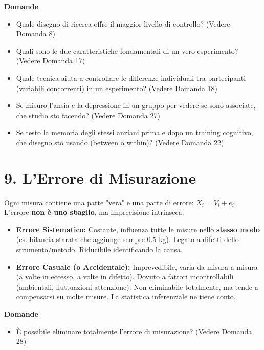 \documentclass[12pt, a4paper]{article}
\newenvironment{reflectionbox}{%
    \medskip %
    \begin{framed}\par\noindent
    \textbf{\color{boxtitlecolor}Domande} \par
    \begin{itemize}[leftmargin=*, label=$\blacktriangleright$]
}{%
    \end{itemize}\par
    \end{framed}
    \medskip %
}
\begin{document}
\begin{reflectionbox}
    \item Quale disegno di ricerca offre il maggior livello di controllo? (Vedere Domanda 8)
    \item Quali sono le due caratteristiche fondamentali di un vero esperimento? (Vedere Domanda 17)
    \item Quale tecnica aiuta a controllare le differenze individuali tra partecipanti (variabili concorrenti) in un esperimento? (Vedere Domanda 18)
    \item Se misuro l'ansia e la depressione in un gruppo per vedere se sono associate, che studio sto facendo? (Vedere Domanda 27)
    \item Se testo la memoria degli stessi anziani prima e dopo un training cognitivo, che disegno sto usando (between o within)? (Vedere Domanda 22)
\end{reflectionbox}

\section*{9. L'Errore di Misurazione}
Ogni misura contiene una parte "vera" e una parte di errore: $X_i = V_i + e_i$. L'errore \textbf{non è uno sbaglio}, ma imprecisione intrinseca.
\begin{itemize}
    \item \textbf{Errore Sistematico:} Costante, influenza tutte le misure nello \textbf{stesso modo} (es. bilancia starata che aggiunge sempre 0.5 kg). Legato a difetti dello strumento/metodo. Riducibile identificando la causa.
    \item \textbf{Errore Casuale (o Accidentale):} Imprevedibile, varia da misura a misura (a volte in eccesso, a volte in difetto). Dovuto a fattori incontrollabili (ambientali, fluttuazioni attenzione). Non eliminabile totalmente, ma tende a compensarsi su molte misure. La statistica inferenziale ne tiene conto.
\end{itemize}

\begin{reflectionbox}
    \item È possibile eliminare totalmente l'errore di misurazione? (Vedere Domanda 28)
\end{reflectionbox}
\end{document}
